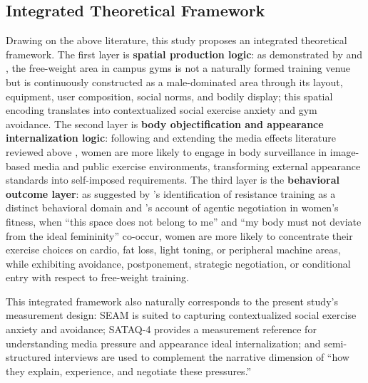 \subsection{Integrated Theoretical Framework}

Drawing on the above literature, this study proposes an integrated theoretical framework.
The first layer is \textbf{spatial production logic}: as demonstrated by \textcite{turnock2021gyms} and \textcite{rendall2024gym}, the free-weight area in campus gyms is not a naturally formed training venue but is continuously constructed as a male-dominated area through its layout, equipment, user composition, social norms, and bodily display; this spatial encoding translates into contextualized social exercise anxiety and gym avoidance.
The second layer is \textbf{body objectification and appearance internalization logic}: following \textcite{fredrickson1997objectification} and extending the media effects literature reviewed above \parencite{holland2016systematic,jung2022social}, women are more likely to engage in body surveillance in image-based media and public exercise environments, transforming external appearance standards into self-imposed requirements.
The third layer is the \textbf{behavioral outcome layer}: as suggested by \textcite{peters2019barriers}'s identification of resistance training as a distinct behavioral domain and \textcite{xiong2021fanshen}'s account of agentic negotiation in women's fitness, when ``this space does not belong to me'' and ``my body must not deviate from the ideal femininity'' co-occur, women are more likely to concentrate their exercise choices on cardio, fat loss, light toning, or peripheral machine areas, while exhibiting avoidance, postponement, strategic negotiation, or conditional entry with respect to free-weight training.

This integrated framework also naturally corresponds to the present study's measurement design:
SEAM is suited to capturing contextualized social exercise anxiety and avoidance; SATAQ-4 provides a measurement reference for understanding media pressure and appearance ideal internalization; and semi-structured interviews are used to complement the narrative dimension of ``how they explain, experience, and negotiate these pressures.''
